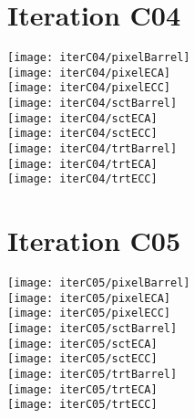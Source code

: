 \documentclass[10pt]{article}
\begin{document}
\section{Iteration C04}

\begin{centering}


\texttt{[image: iterC04/pixelBarrel]}\\
\texttt{[image: iterC04/pixelECA]}\\
\texttt{[image: iterC04/pixelECC]}\\

\texttt{[image: iterC04/sctBarrel]}\\
\texttt{[image: iterC04/sctECA]}\\
\texttt{[image: iterC04/sctECC]}\\

\texttt{[image: iterC04/trtBarrel]}\\
\texttt{[image: iterC04/trtECA]}\\
\texttt{[image: iterC04/trtECC]}\\

\end{centering}

\vspace{10pt}
\section{Iteration C05}

\begin{centering}


\texttt{[image: iterC05/pixelBarrel]}\\
\texttt{[image: iterC05/pixelECA]}\\
\texttt{[image: iterC05/pixelECC]}\\

\texttt{[image: iterC05/sctBarrel]}\\
\texttt{[image: iterC05/sctECA]}\\
\texttt{[image: iterC05/sctECC]}\\

\texttt{[image: iterC05/trtBarrel]}\\
\texttt{[image: iterC05/trtECA]}\\
\texttt{[image: iterC05/trtECC]}\\

\end{centering}
\end{document}
